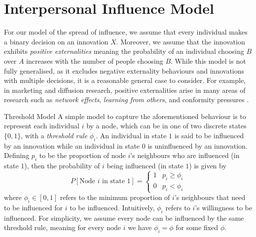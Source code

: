 \documentclass[10pt, oneside, reqno]{amsart}
\makeatletter
\theoremstyle{plain}%
\theoremstyle{definition}
\theoremstyle{remark}
\renewcommand\subsection{\@startsection{subsection}{2}%
  \z@{.5\linespacing\@plus.7\linespacing}{-.5em}%
  {\normalfont\scshape}}
\makeatother
\begin{document}




\section{Interpersonal Influence Model}

For our model of the spread of influence, we assume that every individual makes a binary decision
on an innovation $X$. Moreover, we assume that the innovation exhibits \textit{positive externalities}
meaning the probability of an individual choosing $B$ over $A$ increases with the number of 
people choosing $B$. While this model is not fully generalised, as it excludes negative externality 
behaviours and innovations with multiple decisions, it is a reasonable general case to consider. 
For example, in marketing and diffusion research, positive externalities arise in many areas of 
research such as \textit{network effects}, \textit{learning from others}, and conformity 
pressures \cite{Influential}.

\subsection{Threshold Model}
A simple model to capture the aforementioned behaviour is to represent each individual $i$ by a node,
which can be in one of two discrete states $\{ 0, 1\}$, with a \textit{threshold rule} $\phi_i$. 
An individual in state $1$ is said to be influenced by an innovation while an 
individual in state $0$ is uninfluenced by an innovation.
Defining $p_i$ to be the proportion of node $i$'s neighbours who are influenced (in state $1$), then 
the probability of $i$ being influenced (in state $1$) is given by
\[ P[\text{Node } i \text{ in state } 1] = 
\begin{cases}
    1 & p_i \geq \phi_i \\
    0 & p_i < \phi_i
\end{cases} \]
where $\phi_i \in [0,1]$ refers to the minimum proportion of $i$'s neighbours that need to be 
influenced for $i$ to be influenced. Intuitively, $\phi_i$ refers to $i$'s willingness to be 
influenced.
For simplicity, we assume every node can be influenced by the same threshold rule, meaning 
for every node $i$ we have $\phi_i = \phi$ for some fixed $\phi$.
\end{document}
